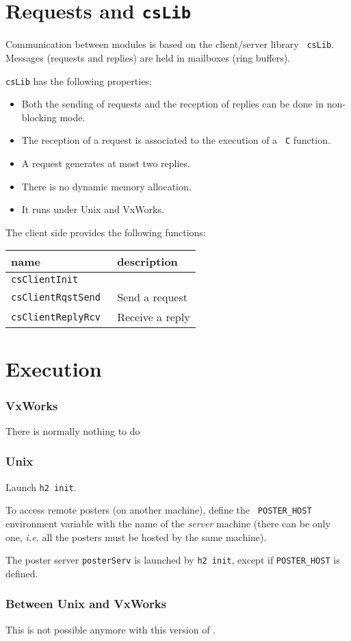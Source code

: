 \section{Requests and {\tt csLib}}

Communication between modules is based  on the client/server library {\tt
csLib}. Messages   (requests and replies)  are   held in mailboxes  (ring
buffers).

{\tt csLib} has the following properties:
\begin{itemize}
\item Both the sending of requests and the reception of replies can be
done in non-blocking mode.
\item The reception of a request is associated to the execution of a {\tt
C} function.
\item A request generates at most two replies.
\item There is no dynamic memory allocation.
\item It runs under Unix and VxWorks.
\end{itemize}

The client side provides the following functions:

\begin{center}\small\begin{tabularx}{\linewidth}{|l|X|}
\hline
name		& description \\
\hline
\tt csClientInit 	& \\
\tt csClientRqstSend 	& Send a request\\
\tt csClientReplyRcv 	& Receive a reply\\
\hline
\end{tabularx}\end{center}


\section{Execution}

\subsubsection{VxWorks} There is normally nothing to do

\subsubsection{Unix} Launch {\tt h2 init}.

To  access   remote posters   (on  another  machine),  define    the {\tt
POSTER\_HOST} environment  variable  with the  name  of the {\em  server}
machine (there can be only one, {\em i.e.} all the posters must be hosted
by the same machine).

The  poster server {\tt posterServ} is  launched by {\tt h2 init}, except
if {\tt POSTER\_HOST} is defined.


\subsubsection{Between Unix and VxWorks} This is not possible anymore
with this version of \GenoM.
